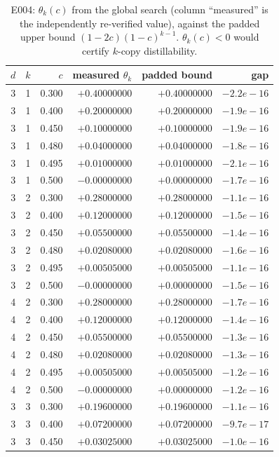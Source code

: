 \begin{table}[h]\centering
\caption{E004: $\theta_k(c)$ from the global search (column ``measured'' is the independently re-verified value), against the padded upper bound $(1-2c)(1-c)^{k-1}$. $\theta_k(c)<0$ would certify $k$-copy distillability.}\label{tab:theta}
{\setlength{\tabcolsep}{8pt}\renewcommand{\arraystretch}{1.2}
\begin{tabular}{rrrrrr}\toprule
$d$ & $k$ & $c$ & measured $\theta_k$ & padded bound & gap \\\midrule
3 & 1 & 0.300 & $+0.40000000$ & $+0.40000000$ & $-2.2e-16$ \\
3 & 1 & 0.400 & $+0.20000000$ & $+0.20000000$ & $-1.9e-16$ \\
3 & 1 & 0.450 & $+0.10000000$ & $+0.10000000$ & $-1.9e-16$ \\
3 & 1 & 0.480 & $+0.04000000$ & $+0.04000000$ & $-1.8e-16$ \\
3 & 1 & 0.495 & $+0.01000000$ & $+0.01000000$ & $-2.1e-16$ \\
3 & 1 & 0.500 & $-0.00000000$ & $+0.00000000$ & $-1.7e-16$ \\
3 & 2 & 0.300 & $+0.28000000$ & $+0.28000000$ & $-1.1e-16$ \\
3 & 2 & 0.400 & $+0.12000000$ & $+0.12000000$ & $-1.5e-16$ \\
3 & 2 & 0.450 & $+0.05500000$ & $+0.05500000$ & $-1.4e-16$ \\
3 & 2 & 0.480 & $+0.02080000$ & $+0.02080000$ & $-1.6e-16$ \\
3 & 2 & 0.495 & $+0.00505000$ & $+0.00505000$ & $-1.1e-16$ \\
3 & 2 & 0.500 & $-0.00000000$ & $+0.00000000$ & $-1.5e-16$ \\
4 & 2 & 0.300 & $+0.28000000$ & $+0.28000000$ & $-1.7e-16$ \\
4 & 2 & 0.400 & $+0.12000000$ & $+0.12000000$ & $-1.4e-16$ \\
4 & 2 & 0.450 & $+0.05500000$ & $+0.05500000$ & $-1.3e-16$ \\
4 & 2 & 0.480 & $+0.02080000$ & $+0.02080000$ & $-1.3e-16$ \\
4 & 2 & 0.495 & $+0.00505000$ & $+0.00505000$ & $-1.2e-16$ \\
4 & 2 & 0.500 & $-0.00000000$ & $+0.00000000$ & $-1.2e-16$ \\
3 & 3 & 0.300 & $+0.19600000$ & $+0.19600000$ & $-1.1e-16$ \\
3 & 3 & 0.400 & $+0.07200000$ & $+0.07200000$ & $-9.7e-17$ \\
3 & 3 & 0.450 & $+0.03025000$ & $+0.03025000$ & $-1.0e-16$ \\

\end{tabular}}
\end{table}
